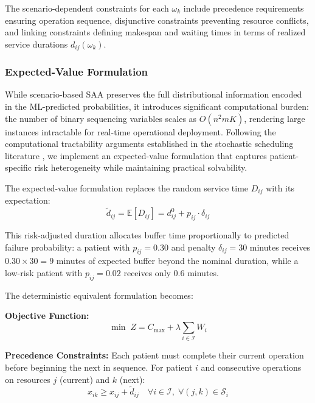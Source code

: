 \documentclass[11pt,a4paper]{article}
\begin{document}
The scenario-dependent constraints for each $\omega_k$ include precedence requirements ensuring operation sequence, disjunctive constraints preventing resource conflicts, and linking constraints defining makespan and waiting times in terms of realized service durations $d_{ij}(\omega_k)$.

\subsubsection{Expected-Value Formulation}

While scenario-based SAA preserves the full distributional information encoded in the ML-predicted probabilities, it introduces significant computational burden: the number of binary sequencing variables scales as $O(n^2 m K)$, rendering large instances intractable for real-time operational deployment. Following the computational tractability arguments established in the stochastic scheduling literature \citep{denton2003sequential, mancilla2012sample}, we implement an expected-value formulation that captures patient-specific risk heterogeneity while maintaining practical solvability.

The expected-value formulation replaces the random service time $D_{ij}$ with its expectation:
\begin{equation}
\tilde{d}_{ij} = \mathbb{E}[D_{ij}] = d_{ij}^0 + p_{ij} \cdot \delta_{ij}
\label{eq:expected_duration}
\end{equation}

This risk-adjusted duration allocates buffer time proportionally to predicted failure probability: a patient with $p_{ij} = 0.30$ and penalty $\delta_{ij} = 30$ minutes receives $0.30 \times 30 = 9$ minutes of expected buffer beyond the nominal duration, while a low-risk patient with $p_{ij} = 0.02$ receives only 0.6 minutes.

The deterministic equivalent formulation becomes:

\textbf{Objective Function:}
\begin{equation}
\min \; Z = C_{\max} + \lambda \sum_{i \in \mathcal{I}} W_i
\label{eq:objective}
\end{equation}

\textbf{Precedence Constraints:} Each patient must complete their current operation before beginning the next in sequence. For patient $i$ and consecutive operations on resources $j$ (current) and $k$ (next):
\begin{equation}
x_{ik} \geq x_{ij} + \tilde{d}_{ij} \quad \forall i \in \mathcal{I}, \; \forall (j, k) \in \mathcal{S}_i
\label{eq:precedence}
\end{equation}
\end{document}
